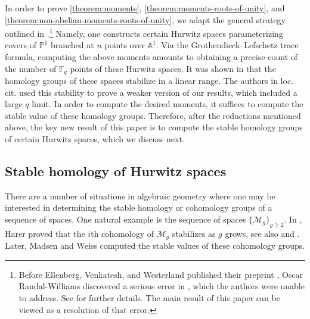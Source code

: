 \documentclass[12 pt]{amsart}
\theoremstyle{plain}
\theoremstyle{definition}
\theoremstyle{remark}
\numberwithin{equation}{section}
\begin{document}
\subsubsection{}
\label{subsubsection:homology-to-cohen-lenstra}
In order to prove \autoref{theorem:moments},
\autoref{theorem:moments-roots-of-unity}, and
\autoref{theorem:non-abelian-moments-roots-of-unity},
we adapt the general strategy outlined in
\cite{ellenbergVWhomologicalII}.\footnote{Before Ellenberg, Venkatesh, and Westerland published their preprint
\cite{ellenbergVWhomologicalII},
Oscar Randal-Williams
discovered a serious error in 
\cite{ellenbergVWhomologicalII},
which the authors were unable to address. See
\cite{ellenberg:homological-stability-withdrawn} for further details. The main
result of this paper can be viewed as a resolution of that error.
}
Namely, one constructs certain Hurwitz spaces parameterizing covers of $\mathbb
P^1$ branched at $n$ points over $\mathbb A^1$. Via the
Grothendieck--Lefschetz trace formula,
computing the above moments
amounts to obtaining a precise count of the number of $\mathbb F_q$ points of
these Hurwitz spaces.
It was shown in \cite{EllenbergVW:cohenLenstra} that the homology groups of
these spaces stabilize in a linear range. The authors in loc. cit. used this stability
to prove a weaker version of our results, which included a large $q$ limit.
In order to compute the desired moments, it suffices to compute the stable
value of these homology groups.
Therefore, after the reductions mentioned above, the key new
result of this paper is to compute the stable homology groups of certain
Hurwitz spaces, which we discuss next.

\subsection{Stable homology of Hurwitz spaces}
\label{subsection:stable-homology-intro}

	There are a number of situations in algebraic geometry where one may be
	interested in determining the stable homology or cohomology groups of a sequence of
	spaces. One natural example is the sequence of spaces $\{\mathscr
	M_g\}_{g \geq 2}$. In
	\cite{Harer1985}, Harer proved that the $i$th cohomology of $\mathscr M_g$
	stabilizes as $g$ grows, see also 
	\cite{wahl:homological-stability-for-the-mapping-class-groups} and
	\cite{Wahl:stability-handbook}.
	Later, Madsen and Weiss
	\cite{madsen-weiss:the-stable-moduli-space-of-riemann-surfaces}
	computed the stable values of these cohomology groups.
\end{document}
